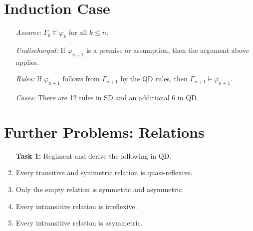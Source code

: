 \documentclass[a4paper, 11pt]{article} %
\begin{document}
\section*{Induction Case}

\begin{enumerate}
  \item[\it Assume:] $\Gamma_k \vDash \varphi_k$ for all $k\leq n$.
  \item[\it Undischarged:] If $\varphi_{n+1}$ is a premise or assumption, then the argument above applies. 
  \item[\it Rules:] If $\varphi_{n+1}$ follows from $\Gamma_{n+1}$ by the QD rules, then $\Gamma_{n+1}\vDash\varphi_{n+1}$.
  \item[\it Cases:] There are 12 rules in SD and an additional 6 in QD.
\end{enumerate}

\section*{Further Problems: Relations}

\begin{enumerate}
  \item[\bf Task 1:] Regiment and derive the following in QD.
  \item Every transitive and symmetric relation is quasi-reflexive.
  \item Only the empty relation is symmetric and asymmetric.
  \item Every intransitive relation is irreflexive.
  \item Every intransitive relation is asymmetric.
\end{enumerate}
\end{document}
